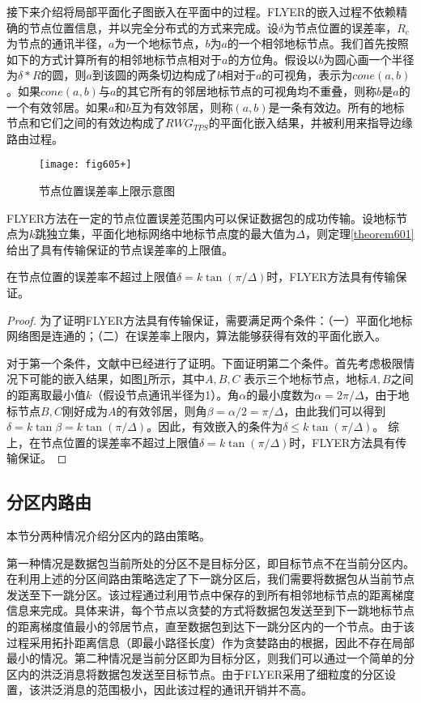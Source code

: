 接下来介绍将局部平面化子图嵌入在平面中的过程。FLYER的嵌入过程不依赖精确的节点位置信息，并以完全分布式的方式来完成。设$\delta$为节点位置的误差率，$R_c$为节点的通讯半径，$a$为一个地标节点，$b$为$a$的一个相邻地标节点。我们首先按照如下的方式计算所有的相邻地标节点相对于$a$的方位角。假设以$b$为圆心画一个半径为$\delta*R$的圆，则$a$到该圆的两条切边构成了$b$相对于$a$的可视角，表示为$cone(a,b)$。如果$cone(a,b)$与$a$的其它所有的邻居地标节点的可视角均不重叠，则称$b$是$a$的一个有效邻居。如果$a$和$b$互为有效邻居，则称$(a,b)$是一条有效边。所有的地标节点和它们之间的有效边构成了$RWG_{TPS}$的平面化嵌入结果，并被利用来指导边缘路由过程。
\begin{figure}[h]
\centering
\texttt{[image: fig605+]}
\caption{节点位置误差率上限示意图}
\label{fig:605+}
\end{figure}

FLYER方法在一定的节点位置误差范围内可以保证数据包的成功传输。设地标节点为$k$跳独立集，平面化地标网络中地标节点度的最大值为$\Delta$，则定理\ref{theorem601}给出了具有传输保证的节点误差率的上限值。
\begin{theorem}
  \label{theorem601}
在节点位置的误差率不超过上限值$\delta=k\tan(\pi/\Delta)$时，FLYER方法具有传输保证。
\end{theorem}
\begin{proof}
为了证明FLYER方法具有传输保证，需要满足两个条件：（一）平面化地标网络图是连通的；（二）在误差率上限内，算法能够获得有效的平面化嵌入。

对于第一个条件，文献中已经进行了证明。下面证明第二个条件。首先考虑极限情况下可能的嵌入结果，如图\ref{fig:605+}所示，其中$A,B,C$ 表示三个地标节点，地标$A,B$之间的距离取最小值$k$（假设节点通讯半径为1）。角$\alpha$的最小度数为$\alpha=2\pi/\Delta$，由于地标节点$B,C$刚好成为$A$的有效邻居，则角$\beta=\alpha/2=\pi/\Delta$，由此我们可以得到$\delta=k\tan\beta=k\tan(\pi/\Delta)$。因此，有效嵌入的条件为$\delta\le{k\tan(\pi/\Delta)}$。 综上，在节点位置的误差率不超过上限值$\delta=k\tan(\pi/\Delta)$时，FLYER方法具有传输保证。
\end{proof}
\subsection{分区内路由}
本节分两种情况介绍分区内的路由策略。

第一种情况是数据包当前所处的分区不是目标分区，即目标节点不在当前分区内。在利用上述的分区间路由策略选定了下一跳分区后，我们需要将数据包从当前节点发送至下一跳分区。该过程通过利用节点中保存的到所有相邻地标节点的距离梯度信息来完成。具体来讲，每个节点以贪婪的方式将数据包发送至到下一跳地标节点的距离梯度值最小的邻居节点，直至数据包到达下一跳分区内的一个节点。由于该过程采用拓扑距离信息（即最小路径长度）作为贪婪路由的根据，因此不存在局部最小的情况。第二种情况是当前分区即为目标分区，则我们可以通过一个简单的分区内的洪泛消息将数据包发送至目标节点。由于FLYER采用了细粒度的分区设置，该洪泛消息的范围极小，因此该过程的通讯开销并不高。
